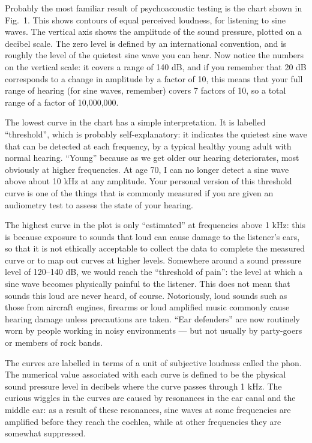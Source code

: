 

  Probably the most familiar result of psychoacoustic testing is the chart 
  shown in Fig.\ 1. This shows contours of equal perceived loudness, for 
  listening to sine waves. The vertical axis shows the amplitude of the sound 
  pressure, plotted on a decibel scale. The zero level is defined by an 
  international convention, and is roughly the level of the quietest sine wave 
  you can hear. Now notice the numbers on the vertical scale: it covers a range 
  of 140 dB, and if you remember that 20 dB corresponds to a change in 
  amplitude by a factor of 10, this means that your full range of hearing (for 
  sine waves, remember) covers 7 factors of 10, so a total range of a factor of 
  10,000,000. 

  The lowest curve in the chart has a simple interpretation. It is labelled 
  ``threshold'', which is probably self-explanatory: it indicates the quietest 
  sine wave that can be detected at each frequency, by a typical healthy young 
  adult with normal hearing. ``Young'' because as we get older our hearing 
  deteriorates, most obviously at higher frequencies. At age 70, I can no 
  longer detect a sine wave above about 10 kHz at any amplitude. Your personal 
  version of this threshold curve is one of the things that is commonly 
  measured if you are given an audiometry test to assess the state of your 
  hearing. 

  The highest curve in the plot is only ``estimated'' at frequencies above 1 
  kHz: this is because exposure to sounds that loud can cause damage to the 
  listener's ears, so that it is not ethically acceptable to collect the data 
  to complete the measured curve or to map out curves at higher levels. 
  Somewhere around a sound pressure level of 120--140 dB, we would reach the 
  ``threshold of pain'': the level at which a sine wave becomes physically 
  painful to the listener. This does not mean that sounds this loud are never 
  heard, of course. Notoriously, loud sounds such as those from aircraft 
  engines, firearms or loud amplified music commonly cause hearing damage 
  unless precautions are taken. ``Ear defenders'' are now routinely worn by 
  people working in noisy environments --- but not usually by party-goers or 
  members of rock bands. 

  The curves are labelled in terms of a unit of subjective loudness called the 
  phon. The numerical value associated with each curve is defined to be the 
  physical sound pressure level in decibels where the curve passes through 1 
  kHz. The curious wiggles in the curves are caused by resonances in the ear 
  canal and the middle ear: as a result of these resonances, sine waves at some 
  frequencies are amplified before they reach the cochlea, while at other 
  frequencies they are somewhat suppressed. 

